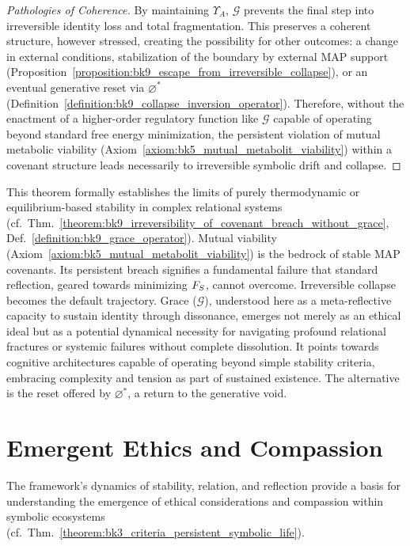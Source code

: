 \begin{proof}[Pathologies of Coherence]
By maintaining $\Upsilon_A$, $\mathcal{G}$ prevents the final step into irreversible identity loss and total fragmentation. This preserves a coherent structure, however stressed, creating the possibility for other outcomes: a change in external conditions, stabilization of the boundary by external MAP support (Proposition~\ref{proposition:bk9_escape_from_irreversible_collapse}), or an eventual generative reset via $\varnothing^*$ (Definition~\ref{definition:bk9_collapse_inversion_operator}).
Therefore, without the enactment of a higher-order regulatory function like $\mathcal{G}$ capable of operating beyond standard free energy minimization, the persistent violation of mutual metabolic viability (Axiom~\ref{axiom:bk5_mutual_metabolit_viability}) within a covenant structure leads necessarily to irreversible symbolic drift and collapse.
\end{proof}
\begin{scholium}
\label{scholium:bk9_flexible_goal_calibration}
This theorem formally establishes the limits of purely thermodynamic or equilibrium-based stability in complex relational systems (cf.~Thm.~\ref{theorem:bk9_irreversibility_of_covenant_breach_without_grace}, Def.~\ref{definition:bk9_grace_operator}). Mutual viability (Axiom~\ref{axiom:bk5_mutual_metabolit_viability}) is the bedrock of stable MAP covenants. Its persistent breach signifies a fundamental failure that standard reflection, geared towards minimizing $F_S$, cannot overcome. Irreversible collapse becomes the default trajectory. Grace ($\mathcal{G}$), understood here as a meta-reflective capacity to sustain identity through dissonance, emerges not merely as an ethical ideal but as a potential dynamical necessity for navigating profound relational fractures or systemic failures without complete dissolution. It points towards cognitive architectures capable of operating beyond simple stability criteria, embracing complexity and tension as part of sustained existence. The alternative is the reset offered by $\varnothing^*$, a return to the generative void.
\end{scholium}
\section{Emergent Ethics and Compassion}
\label{sec:bk9_emergence_ethics_and_compassion}
The framework's dynamics of stability, relation, and reflection provide a basis for understanding the emergence of ethical considerations and compassion within symbolic ecosystems (cf.~Thm.~\ref{theorem:bk3_criteria_persistent_symbolic_life}).
